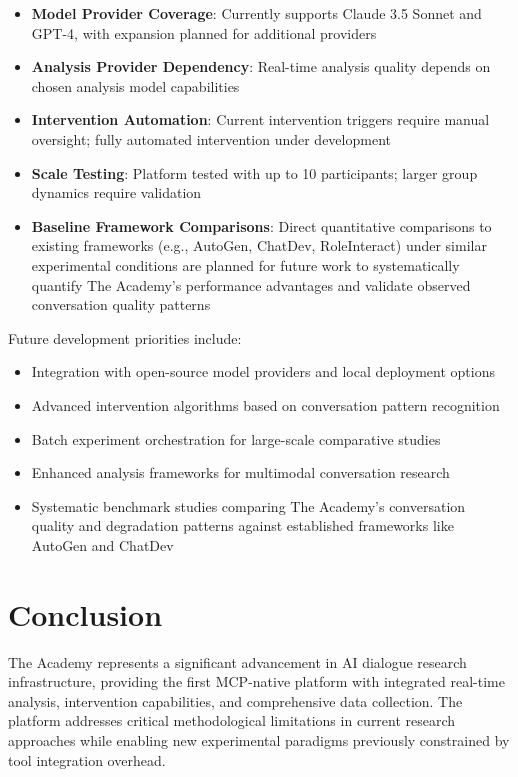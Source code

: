 \documentclass[11pt,letterpaper]{article}
\newcommand{\theacademy}{The Academy}
\newcommand{\mcp}{MCP}
\begin{document}
\begin{itemize}
    \item \textbf{Model Provider Coverage}: Currently supports Claude 3.5 Sonnet and GPT-4, with expansion planned for additional providers
    \item \textbf{Analysis Provider Dependency}: Real-time analysis quality depends on chosen analysis model capabilities
    \item \textbf{Intervention Automation}: Current intervention triggers require manual oversight; fully automated intervention under development
    \item \textbf{Scale Testing}: Platform tested with up to 10 participants; larger group dynamics require validation
    \item \textbf{Baseline Framework Comparisons}: Direct quantitative comparisons to existing frameworks (e.g., AutoGen, ChatDev, RoleInteract) under similar experimental conditions are planned for future work to systematically quantify The Academy's performance advantages and validate observed conversation quality patterns
\end{itemize}

Future development priorities include:
\begin{itemize}
    \item Integration with open-source model providers and local deployment options
    \item Advanced intervention algorithms based on conversation pattern recognition
    \item Batch experiment orchestration for large-scale comparative studies
    \item Enhanced analysis frameworks for multimodal conversation research
    \item Systematic benchmark studies comparing The Academy's conversation quality and degradation patterns against established frameworks like AutoGen and ChatDev
\end{itemize}

\section{Conclusion}

\theacademy{} represents a significant advancement in AI dialogue research infrastructure, providing the first \mcp{}-native platform with integrated real-time analysis, intervention capabilities, and comprehensive data collection. The platform addresses critical methodological limitations in current research approaches while enabling new experimental paradigms previously constrained by tool integration overhead.
\end{document}
